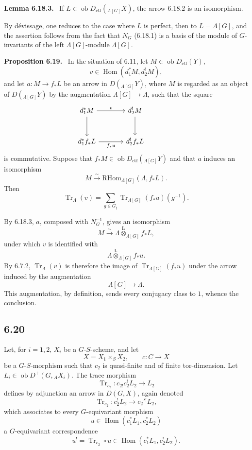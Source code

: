 \documentclass[11pt]{article}
\newenvironment{statement}[1]{\par\medskip\noindent\textbf{#1.}\ }{\par\medskip}
\DeclareMathOperator{\Hom}{Hom}
\providecommand{\RHom}{\mathrm{RHom}}
\providecommand{\Tr}{\operatorname{Tr}}
\providecommand{\Tr}{\operatorname{Tr}}
\providecommand{\lten}{\overset{\mathrm L}{\otimes}}
\providecommand{\Ob}{\operatorname{ob}}
\providecommand{\Tr}{\operatorname{Tr}}
\providecommand{\RHom}{\mathrm{RHom}}
\providecommand{\Hom}{\operatorname{Hom}}
\providecommand{\lten}{\overset{\mathrm L}{\otimes}}
\providecommand{\RHom}{\mathrm R\mathcal{H}om}
\providecommand{\lten}{\overset{\mathrm L}{\otimes}}
\providecommand{\Ob}{\operatorname{ob}}
\providecommand{\Tr}{\operatorname{Tr}}
\providecommand{\lten}{\overset{\mathrm L}{\otimes}}
\providecommand{\lten}{\overset{\mathrm L}{\otimes}}
\providecommand{\Ob}{\operatorname{Ob}}
\providecommand{\lten}{\overset{\mathrm L}{\otimes}}
\providecommand{\RHom}{\mathrm{RHom}}
\begin{document}
\begin{statement}{Lemma 6.18.3}
If $L\in\Ob D_{\mathrm{ctf}}({}_{\Lambda[G]}X)$, the arrow 6.18.2 is an isomorphism.
\end{statement}

By dévissage, one reduces to the case where $L$ is perfect, then to $L=\Lambda[G]$, and the assertion follows from the fact that $N_G$ (6.18.1) is a basis of the module of $G$-invariants of the left $\Lambda[G]$-module $\Lambda[G]$.

\begin{statement}{Proposition 6.19}
In the situation of 6.11, let $M\in\Ob D_{\mathrm{ctf}}(Y)$,
\[
v\in\Hom(d_1^*M,d_2^!M),
\]
and let $a:M\to f_*L$ be an arrow in $D({}_{\Lambda[G]}Y)$, where $M$ is regarded as an object of $D({}_{\Lambda[G]}Y)$ by the augmentation $\Lambda[G]\to\Lambda$, such that the square
\[
\begin{tikzcd}[column sep=large,row sep=large]
d_1^*M \arrow[r,"v"] \arrow[d] & d_2^!M \arrow[d] & {}\\
d_1^*f_*L \arrow[r,"f_*u"'] & d_2^!f_*L
\end{tikzcd}
\]
is commutative. Suppose that $f_*M\in\Ob D_{\mathrm{ctf}}({}_{\Lambda[G]}Y)$ and that $a$ induces an isomorphism
\[
M\xrightarrow{\sim}\RHom_{\Lambda[G]}(\Lambda,f_*L).
\]
Then
\begin{equation}
\Tr_{\Lambda}(v)=
\sum_{g\in G_{\natural}}\Tr_{\Lambda[G]}(f_*u)(g^{-1}).
\tag{6.19.1}
\end{equation}
\end{statement}

By 6.18.3, $a$, composed with $N_G^{-1}$, gives an isomorphism
\[
M\xrightarrow{\sim}\Lambda\lten_{\Lambda[G]}f_*L,
\]
under which $v$ is identified with
\[
\Lambda\lten_{\Lambda[G]}f_*u.
\]
By 6.7.2, $\Tr_{\Lambda}(v)$ is therefore the image of $\Tr_{\Lambda[G]}(f_*u)$ under the arrow induced by the augmentation
\[
\Lambda[G]\longrightarrow \Lambda.
\]
This augmentation, by definition, sends every conjugacy class to $1$, whence the conclusion.

\subsection*{6.20}
Let, for $i=1,2$, $X_i$ be a $G$-$S$-scheme, and let
\[
X=X_1\times_SX_2,\qquad c:C\to X
\]
be a $G$-$S$-morphism such that $c_2$ is quasi-finite and of finite tor-dimension. Let $L_i\in\Ob D^+(G,{}_AX_i)$. The trace morphism
\[
\Tr_{c_2}:c_{2!}c_2^!L_2\longrightarrow L_2
\]
defines by adjunction an arrow in $D(G,X)$, again denoted
\begin{equation}
\Tr_{c_2}:c_2^!L_2\longrightarrow c_2'{}^!L_2,
\tag{6.20.1}
\end{equation}
which associates to every $G$-equivariant morphism
\[
u\in\Hom(c_1^*L_1,c_2^*L_2)
\]
a $G$-equivariant correspondence
\begin{equation}
u^! = \Tr_{c_2}\circ u\in\Hom(c_1^*L_1,c_2^!L_2).
\tag{6.20.2}
\end{equation}
\end{document}
